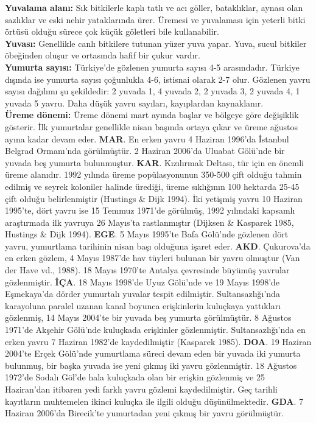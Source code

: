 \documentclass[
  letterpaper,
  DIV=11,
  numbers=noendperiod]{scrreprt}
\begin{document}
\textbf{Yuvalama alanı:} Sık bitkilerle kaplı tatlı ve acı göller,
bataklıklar, aynası olan sazlıklar ve eski nehir yataklarında ürer.
Üremesi ve yuvalaması için yeterli bitki örtüsü olduğu sürece çok küçük
göletleri bile kullanabilir.\\
\textbf{Yuvası:} Genellikle canlı bitkilere tutunan yüzer yuva yapar.
Yuva, sucul bitkiler öbeğinden oluşur ve ortasında hafif bir çukur
vardır.\\
\textbf{Yumurta sayısı:} Türkiye'de gözlenen yumurta sayısı 4-5
arasındadır. Türkiye dışında ise yumurta sayısı çoğunlukla 4-6, istisnai
olarak 2-7 olur. Gözlenen yavru sayısı dağılımı şu şekildedir: 2 yuvada
1, 4 yuvada 2, 2 yuvada 3, 2 yuvada 4, 1 yuvada 5 yavru. Daha düşük
yavru sayıları, kayıplardan kaynaklanır.\\
\textbf{Üreme dönemi:} Üreme dönemi mart ayında başlar ve bölgeye göre
değişiklik gösterir. İlk yumurtalar genellikle nisan başında ortaya
çıkar ve üreme ağustos ayına kadar devam eder. \textbf{MAR}. En erken
yavru 4 Haziran 1996'da İstanbul Belgrad Ormanı'nda görülmüştür. 2
Haziran 2006'da Uluabat Gölü'nde bir yuvada beş yumurta bulunmuştur.
\textbf{KAR}. Kızılırmak Deltası, tür için en önemli üreme alanıdır.
1992 yılında üreme popülasyonunun 350-500 çift olduğu tahmin edilmiş ve
seyrek koloniler halinde ürediği, üreme sıklığının 100 hektarda 25-45
çift olduğu belirlenmiştir (Hustings \& Dijk 1994). İki yetişmiş yavru
10 Haziran 1995'te, dört yavru ise 15 Temmuz 1971'de görülmüş, 1992
yılındaki kapsamlı araştırmada ilk yavruya 26 Mayıs'ta rastlanmıştır
(Dijksen \& Kasparek 1985, Hustings \& Dijk 1994). \textbf{EGE}. 5 Mayıs
1995'te Bafa Gölü'nde gözlenen dört yavru, yumurtlama tarihinin nisan
başı olduğuna işaret eder. \textbf{AKD}. Çukurova'da en erken gözlem, 4
Mayıs 1987'de hav tüyleri bulunan bir yavru olmuştur (Van der Have vd.,
1988). 18 Mayıs 1970'te Antalya çevresinde büyümüş yavrular
gözlenmiştir. \textbf{İÇA}. 18 Mayıs 1998'de Uyuz Gölü'nde ve 19 Mayıs
1998'de Eşmekaya'da dörder yumurtalı yuvalar tespit edilmiştir.
Sultansazlığı'nda karayoluna paralel uzanan kanal boyunca erişkinlerin
kuluçkaya yattıkları gözlenmiş, 14 Mayıs 2004'te bir yuvada beş yumurta
görülmüştür. 8 Ağustos 1971'de Akşehir Gölü'nde kuluçkada erişkinler
gözlenmiştir. Sultansazlığı'nda en erken yavru 7 Haziran 1982'de
kaydedilmiştir (Kasparek 1985). \textbf{DOA}. 19 Haziran 2004'te Erçek
Gölü'nde yumurtlama süreci devam eden bir yuvada iki yumurta bulunmuş,
bir başka yuvada ise yeni çıkmış iki yavru gözlenmiştir. 18 Ağustos
1972'de Sodalı Göl'de hala kuluçkada olan bir erişkin gözlenmiş ve 25
Haziran'dan itibaren yedi farklı yavru gözlemi kaydedilmiştir. Geç
tarihli kayıtların muhtemelen ikinci kuluçka ile ilgili olduğu
düşünülmektedir. \textbf{GDA}. 7 Haziran 2006'da Birecik'te yumurtadan
yeni çıkmış bir yavru görülmüştür.
\end{document}
